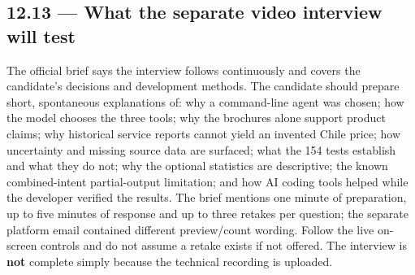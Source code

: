 \documentclass[11pt,a4paper]{article}
\begin{document}
\subsection{12.13 --- What the separate video interview will test}
The official brief says the interview follows continuously and covers the candidate's decisions and development methods. The candidate should prepare short, spontaneous explanations of: why a command-line agent was chosen; how the model chooses the three tools; why the brochures alone support product claims; why historical service reports cannot yield an invented Chile price; how uncertainty and missing source data are surfaced; what the 154 tests establish and what they do not; why the optional statistics are descriptive; the known combined-intent partial-output limitation; and how AI coding tools helped while the developer verified the results. The brief mentions one minute of preparation, up to five minutes of response and up to three retakes per question; the separate platform email contained different preview/count wording. Follow the live on-screen controls and do not assume a retake exists if not offered. The interview is \textbf{not} complete simply because the technical recording is uploaded.
\end{document}
